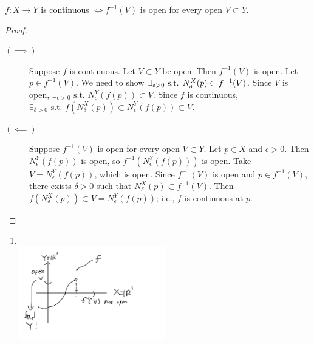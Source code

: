 \begin{theorem}
	$f: X\to Y$ is continuous $\Leftrightarrow  f^{-1}(V)$ is open for every open $V \subset Y$.
	\begin{proof}
		\begin{description}
			\item[$(\implies)$]
			      Suppose $f$ is continuous. Let $V \subset Y$ be open. Then $f^{-1}(V)$ is open.
			      Let $p \in f^{-1}(V)$. We need to show {$\exists_{\delta >0} \text{ s.t. } \linebreak N_{\delta}^{X}(p) \subset f^{-1}(V)$.} Since $V$ is open, $\exists_{\epsilon > 0} \text{ s.t. } N_{\epsilon}^{Y}(f(p)) \subset V$.
			      Since $f$ is continuous, $\exists_{\delta > 0} \text{ s.t. } f(N_{\delta}^{X}(p)) \subset N_{\epsilon}^{Y}(f(p)) \subset V$.
			\item[$(\impliedby)$]
			      Suppose $f^{-1}(V)$ is open for every open $V \subset Y$. Let $p \in X$ and $\epsilon>0$. Then $N_{\epsilon}^{Y}(f(p))$ is open, so $f^{-1}(N_{\epsilon}^{Y}(f(p)))$ is open. Take $V=N_{\epsilon}^{Y}(f(p))$, which is open.
			      Since $f^{-1}(V)$ is open and $p \in f^{-1}(V)$, there exists $\delta>0$ such that $N_{\delta}^{X}(p) \subset f^{-1}(V)$. Then $f(N_{\delta}^{X}(p)) \subset V=N_{\epsilon}^{Y}(f(p))$; i.e., $f$ is continuous at $p$.
		\end{description}
	\end{proof}
	\begin{remark}\hfill
		\begin{enumerate}
			\item
			      \hfill\\
			      \includegraphics[width=0.5\textwidth]{./figs/thm4-8-a.jpeg}

\end{enumerate}
\end{remark}
\end{theorem}
